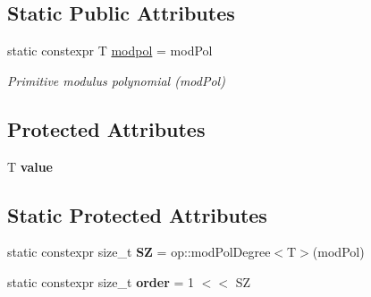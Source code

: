 \subsection*{Static Public Attributes}
\begin{DoxyCompactItemize}
\item 
\mbox{\label{class_g_flinalg_1_1_basic_bin_polynomial_a7484ea6892c60be64255473e0de2bbb8}} 
static constexpr T \mbox{\hyperlink{class_g_flinalg_1_1_basic_bin_polynomial_a7484ea6892c60be64255473e0de2bbb8}{modpol}} = mod\+Pol
\begin{DoxyCompactList}\small\item\em Primitive modulus polynomial (mod\+Pol) \end{DoxyCompactList}\end{DoxyCompactItemize}
\subsection*{Protected Attributes}
\begin{DoxyCompactItemize}
\item 
\mbox{\label{class_g_flinalg_1_1_basic_bin_polynomial_ab3c8209291de43e602c29a434022624b}} 
T {\bfseries value}
\end{DoxyCompactItemize}
\subsection*{Static Protected Attributes}
\begin{DoxyCompactItemize}
\item 
\mbox{\label{class_g_flinalg_1_1_basic_bin_polynomial_a506cfa57c4b705e5715f20e802ea3048}} 
static constexpr size\+\_\+t {\bfseries SZ} = op\+::mod\+Pol\+Degree$<$T$>$(mod\+Pol)
\item 
\mbox{\label{class_g_flinalg_1_1_basic_bin_polynomial_ac9150185b4286faebfd0838eeb4e261b}} 
static constexpr size\+\_\+t {\bfseries order} = 1 $<$$<$ SZ
\end{DoxyCompactItemize}
